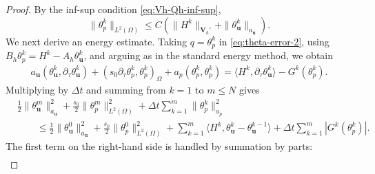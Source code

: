 \documentclass{amsart}
\begin{document}
\begin{proof}
By the inf-sup condition \eqref{eq:Vh-Qh-inf-sup},
\begin{equation}
\label{eq:theta-p-by-theta-u-H}
        \|\theta_p^k\|_{L^2(\Omega)}
        \le
        C\left(
        \|H^k\|_{\boldsymbol V_h'}
        +
        \|\theta_{\boldsymbol u}^k\|_{a_{\boldsymbol u}}
        \right).
\end{equation}
%
We next derive an energy estimate. Taking $q=\theta_p^k$ in
\eqref{eq:theta-error-2}, using
$B_h\theta_p^k=H^k-A_h\theta_{\boldsymbol u}^k$, and arguing as in the
standard energy method, we obtain
\[
\begin{aligned}
a_{\boldsymbol u}(\theta_{\boldsymbol u}^k,\partial_\tau\theta_{\boldsymbol u}^k)
+
(s_0\partial_\tau\theta_p^k,\theta_p^k)_\Omega
+
a_p(\theta_p^k,\theta_p^k)
=
\langle H^k,\partial_\tau\theta_{\boldsymbol u}^k\rangle
-
G^k(\theta_p^k).
\end{aligned}
\]
Multiplying by $\Delta t$ and summing from $k=1$ to $m\le N$ gives
\begin{align}
\label{eq:theta-energy-before-est}
&\frac12\|\theta_{\boldsymbol u}^m\|_{a_{\boldsymbol u}}^2
+
\frac{s_0}{2}\|\theta_p^m\|_{L^2(\Omega)}^2
+
\Delta t\sum_{k=1}^m
\|\theta_p^k\|_{a_p}^2
\\
&\qquad
\le \frac12\|\theta_{\boldsymbol u}^0\|_{a_{\boldsymbol u}}^2
+
\frac{s_0}{2}\|\theta_p^0\|_{L^2(\Omega)}^2 + 
\sum_{k=1}^m
\langle H^k,\theta_{\boldsymbol u}^k-\theta_{\boldsymbol u}^{k-1}\rangle
+
\Delta t\sum_{k=1}^m
|G^k(\theta_p^k)|.
\nonumber
\end{align}
The first term on the right-hand side is handled by summation by parts:
\[
\begin{aligned}

\end{aligned}\]
\end{proof}
\end{document}
